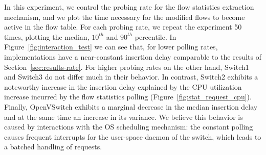 In this experiment, we control the probing rate for the flow statistics 
extraction mechanism, and we plot the time necessary for the modified 
flows to become active in the flow table. For each probing rate, we
repeat the experiment 50 times, plotting the median, $10^{th}$ and 
$90^{th}$ percentile. In Figure~\ref{fig:interaction_test} we can see
that, for lower polling rates, implementations have a near-constant
insertion delay comparable to the results of Section~\ref{sec:results-rate}.
For higher probing rates on the other hand, Switch1 and Switch3 do 
not differ much in their behavior. In contrast, Switch2 exhibits a noteworthy 
increase in the insertion delay explained by the CPU utilization increase
incurred by the flow statistics polling (Figure~\ref{fig:stat_request_cpu}). Finally,
OpenVSwitch exhibits a marginal decrease in the median insertion delay
and at the same time an increase in its variance. We believe this behavior 
is caused by interactions with the OS scheduling mechanism: the constant 
polling causes frequent interrupts for the user-space daemon of the switch, 
which leads to a batched handling of requests.

